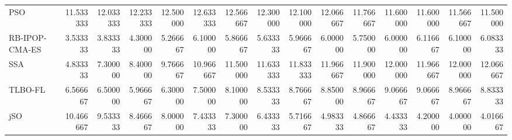 \begin{tabular}{lrrrrrrrrrrrrrr}
PSO            &  11.533333 &  12.033333 &  12.233333 &  12.500000 &  12.633333 &  12.566667 &  12.300000 &  12.100000 &  12.066667 &  11.766667 &  11.600000 &  11.600000 &  11.566667 &  11.500000 \\
RB-IPOP-CMA-ES &   3.533333 &   3.833333 &   4.300000 &   5.266667 &   6.100000 &   5.866667 &   5.633333 &   5.966667 &   6.000000 &   5.750000 &   6.000000 &   6.116667 &   6.100000 &   6.083333 \\
SSA            &   4.833333 &   7.300000 &   8.400000 &   9.766667 &  10.966667 &  11.500000 &  11.633333 &  11.833333 &  11.966667 &  11.900000 &  12.000000 &  11.966667 &  12.000000 &  12.066667 \\
TLBO-FL        &   6.566667 &   6.500000 &   5.966667 &   6.300000 &   7.500000 &   8.100000 &   8.533333 &   8.766667 &   8.850000 &   8.966667 &   9.066667 &   9.066667 &   8.966667 &   8.833333 \\
jSO            &  10.466667 &   9.533333 &   8.466667 &   8.000000 &   7.433333 &   7.300000 &   6.433333 &   5.716667 &   4.983333 &   4.866667 &   4.433333 &   4.200000 &   4.000000 &   4.016667 \\
\bottomrule
\end{tabular}
